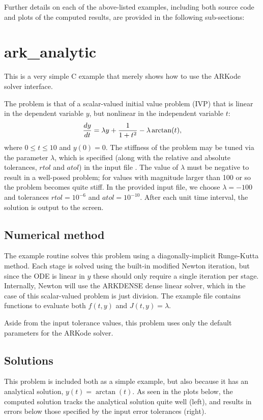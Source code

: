 \documentclass[letterpaper,10pt,english]{sphinxmanual}
\begin{document}
Further details on each of the above-listed examples, including both
source code and plots of the computed results, are provided in the
following sub-sections:


\chapter{ark\_analytic}
\label{ark_analytic:ark-analytic}\label{ark_analytic::doc}\label{ark_analytic:arkode-example-documentation}\label{ark_analytic:id1}
This is a very simple C example that merely shows how to use the
ARKode solver interface.

The problem is that of a scalar-valued initial value problem (IVP)
that is linear in the dependent variable $y$, but nonlinear in
the independent variable $t$:
\begin{gather}
\begin{split}\frac{dy}{dt} = \lambda y + \frac{1}{1+t^2} - \lambda \arctan(t),\end{split}\notag
\end{gather}
where $0\le t\le 10$ and $y(0)=0$.  The stiffness of the
problem may be tuned via the parameter $\lambda$, which is
specified (along with the relative and absolute tolerances,
$rtol$ and $atol$) in the input file
.  The value of $\lambda$ must be negative
to result in a well-posed problem; for values with magnitude larger
than 100 or so the problem becomes quite stiff.  In the provided input
file, we choose $\lambda=-100$ and tolerances
$rtol=10^{-6}$ and $atol=10^{-10}$.    After each unit
time interval, the solution is output to the screen.


\section{Numerical method}
\label{ark_analytic:numerical-method}
The example routine solves this problem using a diagonally-implicit
Runge-Kutta method.  Each stage is solved using the built-in modified
Newton iteration, but since the ODE is linear in $y$ these
should only require a single iteration per stage.  Internally, Newton
will use the ARKDENSE dense linear solver, which in the case of this
scalar-valued problem is just division.  The example file contains
functions to evaluate both $f(t,y)$ and $J(t,y)=\lambda$.

Aside from the input tolerance values, this problem uses only the
default parameters for the ARKode solver.


\section{Solutions}
\label{ark_analytic:solutions}
This problem is included both as a simple example, but also because it
has an analytical solution, $y(t) = \arctan(t)$.  As seen in the
plots below, the computed solution tracks the analytical solution
quite well (left), and results in errors below those specified by the input
error tolerances (right).
\end{document}
